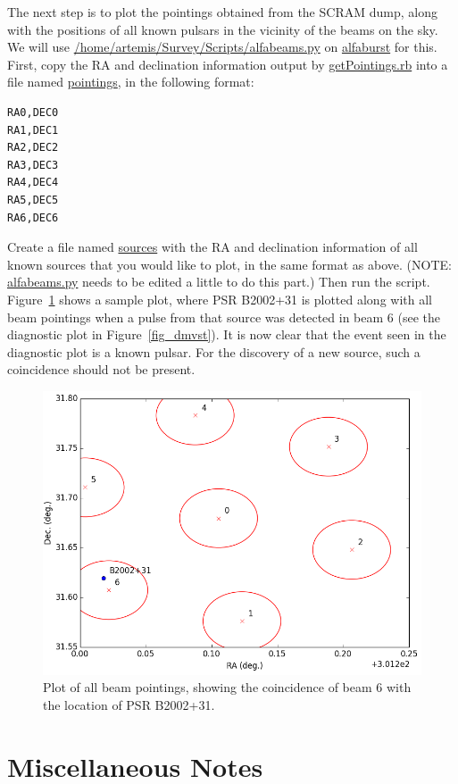 \documentclass{article}
\begin{document}
The next step is to plot the pointings obtained from the SCRAM dump, along with
the positions of all known pulsars in the vicinity of the beams on the sky. We
will use \url{/home/artemis/Survey/Scripts/alfabeams.py} on \url{alfaburst} for
this. First, copy the RA and declination information output by
\url{getPointings.rb} into a file named \url{pointings}, in the following
format:

\small{
\begin{verbatim}
RA0,DEC0
RA1,DEC1
RA2,DEC2
RA3,DEC3
RA4,DEC4
RA5,DEC5
RA6,DEC6
\end{verbatim}
}

Create a file named \url{sources} with the RA and declination information of
all known sources that you would like to plot, in the same format as above.
(NOTE: \url{alfabeams.py} needs to be edited a little to do this part.) Then
run the script. Figure~\ref{fig_pointings} shows a sample plot, where PSR
B2002+31 is plotted along with all beam pointings when a pulse from that source
was detected in beam 6 (see the diagnostic plot in Figure~\ref{fig_dmvst}). It
is now clear that the event seen in the diagnostic plot is a known pulsar. For
the discovery of a new source, such a coincidence should not be present.

\begin{figure}[h]
\includegraphics[width=\textwidth]{pointings.png}
\caption{Plot of all beam pointings, showing the coincidence of beam 6 with the
location of PSR B2002+31.\label{fig_pointings}}
\end{figure}


\section{Miscellaneous Notes}
\end{document}
